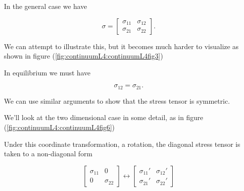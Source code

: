 In the general case we have

\begin{equation}\label{eqn:continuumL4:70}
\sigma = 
\begin{bmatrix}
\sigma_{11} & \sigma_{12} \\
\sigma_{21} & \sigma_{22}
\end{bmatrix}.
\end{equation}

We can attempt to illustrate this, but it becomes much harder to visualize as shown in figure (\ref{fig:continuumL4:continuumL4fig3})

In equilibrium we must have

\begin{equation}\label{eqn:continuumL4:90}
\sigma_{12} = \sigma_{21}.
\end{equation}

We can use similar arguments to show that the stress tensor is symmetric.

We'll look at the two dimensional case in some detail, as in figure (\ref{fig:continuumL4:continuumL4fig6})


Under this coordinate transformation, a rotation, the diagonal stress tensor is taken to a non-diagonal form 

\begin{equation}\label{eqn:continuumL4:130}
\begin{bmatrix}
\sigma_{11} & 0 \\
0 & \sigma_{22} 
\end{bmatrix}
\leftrightarrow
\begin{bmatrix}
\sigma_{11}' & \sigma_{12}' \\
\sigma_{21}' & \sigma_{22}' 
\end{bmatrix}
\end{equation}
